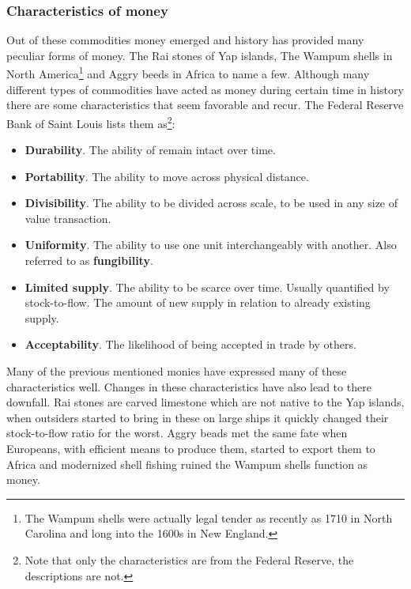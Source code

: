 \subsubsection{Characteristics of money}
	\label{sec:characteristics:money}

Out of these commodities money emerged and history has provided many peculiar forms of money. The Rai stones of Yap islands, The Wampum shells in North America\footnote{The Wampum shells were actually legal tender as recently as 1710 in North Carolina and long into the 1600s in New England.}\cite{szabo:shelling:out} and Aggry beeds in Africa to name a few. Although many different types of commodities have acted as money during certain time in history there are some characteristics that seem favorable and recur. The Federal Reserve Bank of Saint Louis lists them as\cite{fed:function:money}\footnote{Note that only the characteristics are from the Federal Reserve, the descriptions are not.}:

\begin{itemize}
	\item \textbf{Durability}. The ability of remain intact over time.
	
	\item \textbf{Portability}. The ability to move across physical distance.
	
	\item \textbf{Divisibility}. The ability to be divided across scale, to be used in any size of value transaction.
	
	\item \textbf{Uniformity}. The ability to use one unit interchangeably with another. Also referred to as \textbf{fungibility}.
	
	\item \textbf{Limited supply}. The ability to be scarce over time. Usually quantified by stock-to-flow. The amount of new supply in relation to already existing supply.
	
	\item \textbf{Acceptability}. The likelihood of being accepted in trade by others.
\end{itemize}

Many of the previous mentioned monies have expressed many of these characteristics well. Changes in these characteristics have also lead to there downfall. Rai stones are carved limestone which are not native to the Yap islands, when outsiders started to bring in these on large ships it quickly changed their stock-to-flow ratio for the worst\cite{ammous:bitcoin:standard}. Aggry beads met the same fate when Europeans, with efficient means to produce them, started to export them to Africa and modernized shell fishing ruined the Wampum shells function as money\cite{szabo:shelling:out}.

